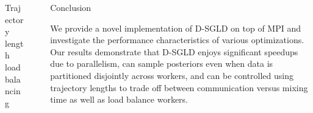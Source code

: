\documentclass[final]{beamer}
\newlength{\sepwid}
\newlength{\onecolwid}
\newlength{\twocolwid}
\begin{document}
\begin{frame}[t]
\begin{columns}[t]
\begin{column}{\twocolwid}
\begin{columns}[t,totalwidth=\twocolwid]
\begin{column}{\onecolwid}
\begin{block}{Trajectory length load balancing}
\end{block}



\end{column} %

\end{columns} %


\end{column} %

\begin{column}{\sepwid}\end{column} %

\begin{column}{\onecolwid} %


\begin{block}{Conclusion}

  We provide a novel implementation of D-SGLD on top of MPI and investigate the performance
  characteristics of various optimizations. Our results demonstrate that D-SGLD enjoys
  significant speedups due to parallelism, can sample posteriors even when data is partitioned
  disjointly across workers, and can be controlled using trajectory lengths to trade off
  between communication versus mixing time as well as load balance workers.
\end{block}





\end{column}
\end{columns}
\end{frame}
\end{document}
